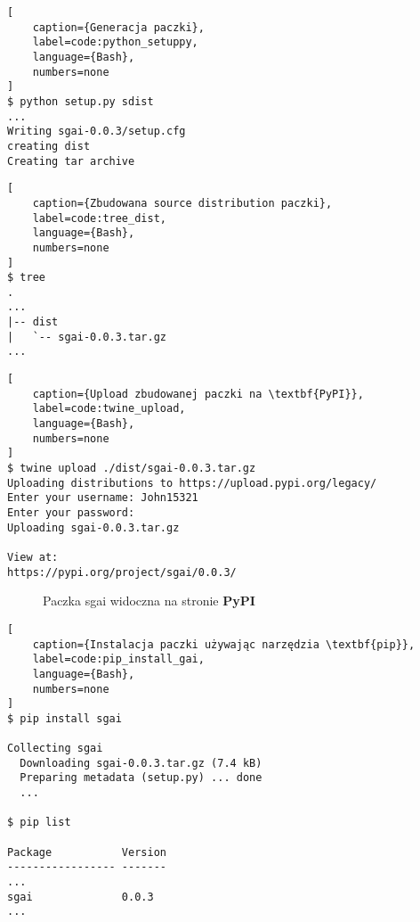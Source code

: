 \begin{onepage}
    \begin{lstlisting}[
    caption={Generacja paczki},
    label=code:python_setuppy,
    language={Bash},
    numbers=none
]
$ python setup.py sdist
...
Writing sgai-0.0.3/setup.cfg
creating dist
Creating tar archive
    \end{lstlisting}
\end{onepage}


\begin{onepage}
    \begin{lstlisting}[
    caption={Zbudowana source distribution paczki},
    label=code:tree_dist,
    language={Bash},
    numbers=none
]
$ tree
.
...
|-- dist
|   `-- sgai-0.0.3.tar.gz
...
    \end{lstlisting}
\end{onepage}


\begin{onepage}
    \begin{lstlisting}[
    caption={Upload zbudowanej paczki na \textbf{PyPI}},
    label=code:twine_upload,
    language={Bash},
    numbers=none
]
$ twine upload ./dist/sgai-0.0.3.tar.gz
Uploading distributions to https://upload.pypi.org/legacy/
Enter your username: John15321
Enter your password:
Uploading sgai-0.0.3.tar.gz

View at:
https://pypi.org/project/sgai/0.0.3/
    \end{lstlisting}
\end{onepage}


\begin{figure}[h]
    \centering
    \caption{Paczka sgai widoczna na stronie \textbf{PyPI}}
    \label{img:sgai_on_pypi}
\end{figure}




\begin{onepage}
    \begin{lstlisting}[
    caption={Instalacja paczki używając narzędzia \textbf{pip}},
    label=code:pip_install_gai,
    language={Bash},
    numbers=none
]
$ pip install sgai

Collecting sgai
  Downloading sgai-0.0.3.tar.gz (7.4 kB)
  Preparing metadata (setup.py) ... done
  ...

$ pip list

Package           Version
----------------- -------
...
sgai              0.0.3
...
\end{lstlisting}
\end{onepage}



